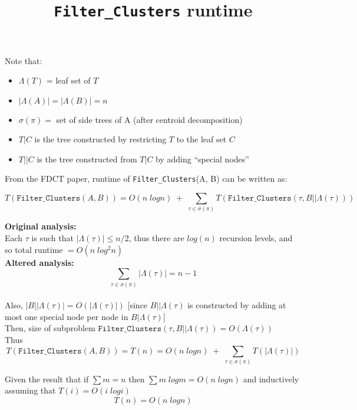 \documentclass[a4paper]{article}
\title{\texttt{Filter\_Clusters} runtime}
\begin{document}
    \maketitle

    Note that:
    \begin{itemize}
        \item $\Lambda(T)$ = leaf set of $T$
        \item $|\Lambda(A)| = |\Lambda(B)| = n$
        \item $\sigma(\pi) = $ set of side trees of A (after centroid decomposition)
        \item $T|C$ is the tree constructed by restricting $T$ to the leaf set $C$
        \item $T||C$ is the tree constructed from $T|C$ by adding ``special nodes''
    \end{itemize}

    \vspace*{\bigskipamount}

    From the FDCT paper, runtime of \texttt{Filter\_Clusters}(A, B) can be written as:

    \begin{equation}
        T(\texttt{Filter\_Clusters}(A, B)) = O(n\;logn)\;+\;\sum_{\tau\in\sigma(\pi)} T(\texttt{Filter\_Clusters}(\tau, B||\Lambda(\tau)))
    \end{equation}

    \textbf{Original analysis:}\\

    Each $\tau$ is such that $|\Lambda(\tau)| \leq n/2$, thus there are $log(n)$ recursion levels, and so total runtime $= O(n\;log^2n)$\\

    \textbf{Altered analysis:}\\

    \[\sum\limits_{\tau\in\sigma(\pi)}|\Lambda(\tau)| = n - 1\]\\
    Also, $|B||\Lambda(\tau)| = O(|\Lambda(\tau)|)$ [since $B||\Lambda(\tau)$ is constructed by adding at most one special node per node in $B|\Lambda(\tau)$]\\

    Then, size of subproblem $\texttt{Filter\_Clusters}(\tau, B||\Lambda(\tau)) = O(\Lambda(\tau))$\\

    Thus
    \begin{equation}
        T(\texttt{Filter\_Clusters}(A, B)) = T(n) = O(n\;logn)\;+\;\sum_{\tau\in\sigma(\pi)}T(|\Lambda(\tau)|)
    \end{equation}

    Given the result that if $\sum{m} = n$ then $\sum{m\;logm} = O(n\;logn)$ and inductively assuming that $T(i) = O(i\;logi)$
    \begin{equation}
        T(n) = O(n\;logn)
    \end{equation}
\end{document}
